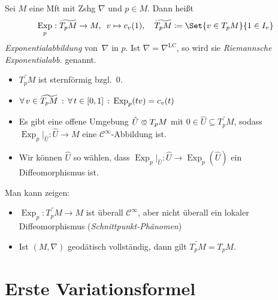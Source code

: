 \documentclass{cheat-sheet}
\DeclareMathOperator{\Exp}{Exp} %
\newcommand{\Cont}{\mathcal{C}} %
\newcommand{\LC}{\nabla^{\mathrm{LC}}} %
\begin{document}

\begin{defn}
  Sei $M$ eine Mft mit Zshg $\nabla$ und $p \in M$. Dann heißt
  \[
    \Exp_p : \widetilde{T_p M} \to M, \enspace
    v \mapsto c_v(1), \quad
    \widetilde{T_p M} \coloneqq \Set{ v \in T_p M }{ 1 \in I_v }
  \]
  \emph{Exponentialabbildung} von~$\nabla$ in $p$.
  Ist $\nabla = \LC$, so wird sie \emph{Riemannsche Exponentialabb.} genannt.
\end{defn}

\begin{lem}
  \begin{itemize}
    \item $\widetilde{T_p M}$ ist sternförmig bzgl.~$0$.
    \item $\fa{v \in \widetilde{T_p M}} \fa{t \in \cinterval{0}{1}} \Exp_p(tv) = c_v(t)$
  \end{itemize}
\end{lem}

\begin{satz}
  \begin{itemize}
    \item Es gibt eine offene Umgebung $\hat{U} \opn T_p M$ mit $0 \in \hat{U} \subseteq \widetilde{T_p M}$, sodass $\Exp_p|_{\hat{U}} : \hat{U} \to M$ eine $\Cont^\infty$-Abbildung ist.
    \item Wir können $\hat{U}$ so wählen, dass $\Exp_p|_{\hat{U}} : \hat{U} \to \Exp_p(\hat{U})$ ein Diffeomorphismus ist.
  \end{itemize}
\end{satz}

\begin{bem}
  Man kann zeigen: \enspace
  \begin{itemize}
    \item $\Exp_p : \widetilde{T_p M} \to M$ ist überall $\Cont^\infty$, aber nicht überall ein lokaler Diffeomorphismus (\textit{Schnittpunkt-Phänomen})
    \item Ist $(M, \nabla)$ geodätisch vollständig, dann gilt $\widetilde{T_p M} = T_p M$.
  \end{itemize}
\end{bem}


\section{Erste Variationsformel}
\end{document}

